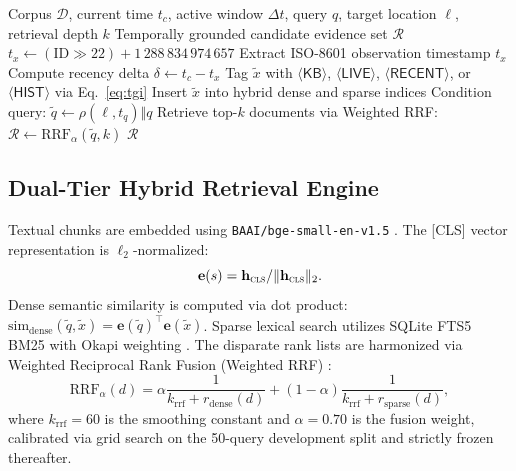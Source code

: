 \documentclass[conference]{IEEEtran}
\begin{document}
\begin{algorithm}[!t]
\caption{TGI Indexing and Grounded Query Conditioning}
\label{alg:tgi}
\begin{algorithmic}[1]
\REQUIRE Corpus $\mathcal{D}$, current time $t_c$, active window $\Delta t$, query $q$, target location $\ell$, retrieval depth $k$
\ENSURE Temporally grounded candidate evidence set $\mathcal{R}$
    \STATE $t_x \leftarrow (\mathrm{ID} \gg 22) + 1\,288\,834\,974\,657$
  \ELSE
    \STATE Extract ISO-8601 observation timestamp $t_x$
  \ENDIF
  \STATE Compute recency delta $\delta \leftarrow t_c - t_x$
  \STATE Tag $\tilde{x}$ with $\langle\mathsf{KB}\rangle$, $\langle\mathsf{LIVE}\rangle$, $\langle\mathsf{RECENT}\rangle$, or $\langle\mathsf{HIST}\rangle$ via Eq.~\eqref{eq:tgi}
  \STATE Insert $\tilde{x}$ into hybrid dense and sparse indices
\ENDFOR
\STATE Condition query: $\tilde{q} \leftarrow \rho(\ell, t_q) \Vert q$
\STATE Retrieve top-$k$ documents via Weighted RRF: $\mathcal{R} \leftarrow \mathrm{RRF}_\alpha(\tilde{q}, k)$
\RETURN $\mathcal{R}$
\end{algorithmic}
\end{algorithm}

\subsection{Dual-Tier Hybrid Retrieval Engine}
Textual chunks are embedded using \texttt{BAAI/bge-small-en-v1.5} \cite{bge}. The [CLS] vector representation is $\ell_2$-normalized:
\begin{equation}
\mathbf{e}(s) = \mathbf{h}_{\textsc{cls}} / \lVert\mathbf{h}_{\textsc{cls}}\rVert_2 .
\label{eq:emb}
\end{equation}
Dense semantic similarity is computed via dot product: $\mathrm{sim}_{\mathrm{dense}}(\tilde{q}, \tilde{x}) = \mathbf{e}(\tilde{q})^\top \mathbf{e}(\tilde{x})$. Sparse lexical search utilizes SQLite FTS5 BM25 with Okapi weighting \cite{bm25}. The disparate rank lists are harmonized via Weighted Reciprocal Rank Fusion (Weighted RRF) \cite{rrf}:
\begin{equation}
\mathrm{RRF}_{\alpha}(d) = \alpha \frac{1}{k_{\mathrm{rrf}} + r_{\mathrm{dense}}(d)} + (1 - \alpha) \frac{1}{k_{\mathrm{rrf}} + r_{\mathrm{sparse}}(d)},
\label{eq:rrf}
\end{equation}
where $k_{\mathrm{rrf}} = 60$ is the smoothing constant and $\alpha = 0.70$ is the fusion weight, calibrated via grid search on the 50-query development split and strictly frozen thereafter.
\end{document}
